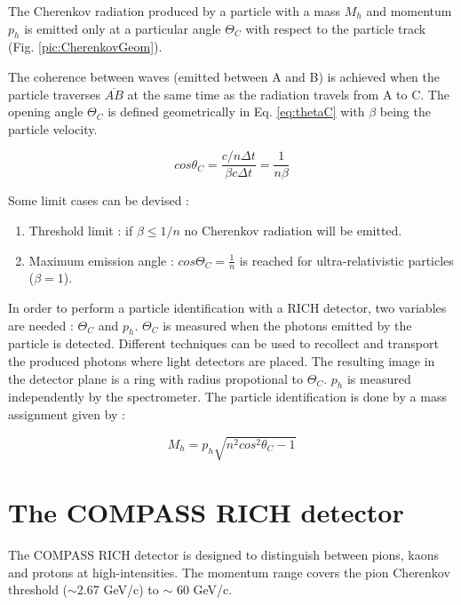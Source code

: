 The Cherenkov radiation produced by a particle with a mass $M_h$ and momentum $p_h$ is emitted only at a particular angle $\Theta_C$ with respect to the particle track (Fig. \ref{pic:CherenkovGeom}).

The coherence between waves (emitted between A and B) is achieved when the particle traverses $\overline{AB}$ at the same time as the radiation travels from A to C. The opening angle $\Theta_C$ is defined geometrically in Eq. \ref{eq:thetaC} with $\beta$ being the particle velocity.

\begin{equation}
  cos\theta_C = \frac{c/n \Delta t}{\beta c \Delta t} = \frac{1}{n\beta}
  \label{eq:thetaC}
\end{equation}

Some limit cases can be devised :
\begin{enumerate}
  \item Threshold limit : if $\beta \leq 1/n$ no Cherenkov radiation will be emitted.
  \item Maximum emission angle : $cos \Theta_C = \frac{1}{n}$ is reached for ultra-relativistic particles ($\beta = 1$).
\end{enumerate}

In order to perform a particle identification with a RICH detector, two variables are needed : $\Theta_C$ and $p_h$. $\Theta_C$ is measured when the photons emitted by the particle is detected. Different techniques can be used to recollect and transport the produced photons where light detectors are placed. The resulting image in the detector plane is a ring with radius propotional to $\Theta_C$. $p_h$ is measured independently by the spectrometer. The particle identification is done by a mass assignment given by :

\begin{equation}
  M_h = p_h \sqrt{n^2 cos^2 \theta_C -1}
\end{equation}


\section{The COMPASS RICH detector}

The COMPASS RICH detector is designed to distinguish between pions, kaons and protons at high-intensities. The momentum range covers the pion Cherenkov threshold ($\sim$2.67 GeV/c) to $\sim$ 60 GeV/c.

